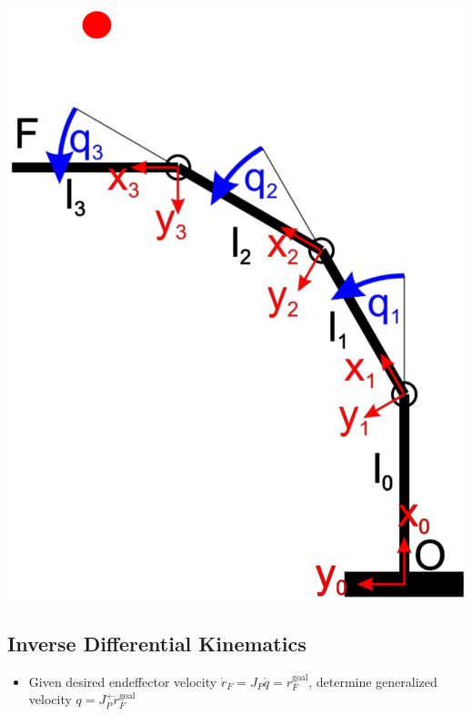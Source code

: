 \begin{minipage}[b]{0.38\linewidth}
    \includegraphics[width=\linewidth]{./Figures/03_InverseKinematrics.png}
\end{minipage}

\subsection{Inverse Differential Kinematics}
\begin{itemize}
    \item Given desired endeffector velocity $\dot r_{F} = J_P \dot q = r^\text{goal}_F$, determine generalized velocity $q = J^+_P \dot r^\text{goal}_F$
\end{itemize}

